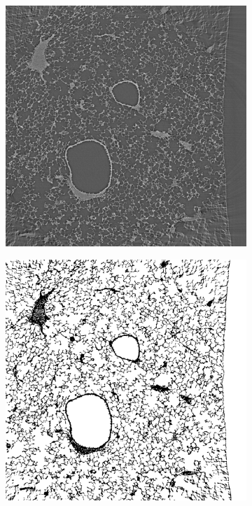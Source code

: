 \begin{figure}[htb]
    \centering
    \begin{subfigure}[b]{.49\textwidth}
    \centering
    \includegraphics[width=\textwidth]{gfx/lung-paper-figures/KO202_LL_control_20700_rec16bit.png}
    \caption{}
    \label{fig:reconstructed}
    \end{subfigure}
    \hfill
    \begin{subfigure}[b]{.49\textwidth}
    \centering
    \includegraphics[width=\textwidth]{gfx/lung-paper-figures/rec_16bit_segmented0700_compressed.png}

\end{subfigure}
\end{figure}
